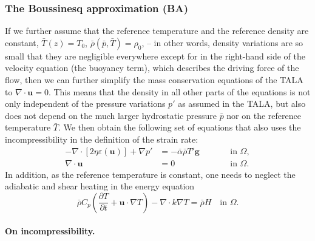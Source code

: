 \documentclass{article}
\begin{document}
\subsubsection{The Boussinesq approximation (BA)}
\label{sec:Boussinesq}

If we further assume that the reference temperature and the reference density are constant, 
$\bar T(z)=T_0$, $\bar\rho(\bar p,\bar T)=\rho_0$, 
-- in other words, density variations are so small that 
they are negligible everywhere except for in the right-hand side of the velocity 
equation (the buoyancy term), which describes the driving force of the flow, 
then we can further simplify the mass conservation equations of the
TALA to $\nabla \cdot \mathbf u=0$. 
This means that the density in all other parts of the equations is not only independent of
the pressure variations $p'$ as assumed in the TALA, but also does not depend on
the much larger hydrostatic pressure $\bar p$ nor on the reference temperature
$\bar T$. We then obtain the following set of
equations that also uses the incompressibility in the definition of the strain rate:
\begin{align}
  \label{eq:stokes-BA-1}
  -\nabla \cdot \left[2\eta \varepsilon(\mathbf u)
                \right] + \nabla p' &=
  -\bar \alpha \bar\rho T' \mathbf g
  & \qquad
  & \textrm{in $\Omega$},
  \\
  \label{eq:stokes-BA-2}
  \nabla \cdot \mathbf u &= 0
  & \qquad
  & \textrm{in $\Omega$}.
\end{align}
In addition, as the reference temperature is constant, one needs to neglect the
adiabatic and shear heating in the energy equation
\begin{equation}
  \label{eq:temperature-BA}
  \bar\rho C_p \left(\frac{\partial T}{\partial t} + \mathbf u\cdot\nabla
  T\right) - \nabla\cdot k\nabla T
  =
  \bar\rho H
  \quad
  \textrm{in $\Omega$}.
\end{equation}

\paragraph*{On incompressibility.}
\end{document}
